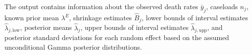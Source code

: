 \documentclass[article]{jss}
\begin{document}
The output contains information about the observed death rates $\bar{y}_{j}$, caseloads $n_{j}$, known prior mean $\lambda^E$, shrinkage estimates $\hat{B}_{j}$, lower bounds of interval estimates $\hat{\lambda}_{j, \textrm{low}}$, posterior means $\hat{\lambda}_j$, upper bounds  of interval estimates $\hat{\lambda}_{j, \textrm{upp}}$, and posterior standard deviations  for each random effect based on the assumed unconditional Gamma posterior distributions. %

\end{document}
